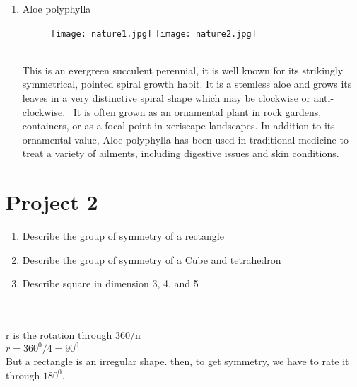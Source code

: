 \documentclass{article}
\begin{document}
\begin{enumerate}
    \item Aloe polyphylla
\graphicspath{{pictures/}}
\begin{figure}[htp]
    \texttt{[image: nature1.jpg]}
    \texttt{[image: nature2.jpg]}
\end{figure}
\\
This is an  evergreen succulent perennial, it is well known for its strikingly symmetrical, pointed spiral growth habit. It is a stemless aloe and grows its leaves in a very distinctive spiral shape which may be clockwise or anti-clockwise. 
It is often grown as an ornamental plant in rock gardens, containers, or as a focal point in xeriscape landscapes. In addition to its ornamental value, Aloe polyphylla has been used in traditional medicine to treat a variety of ailments, including digestive issues and skin conditions.
\end{enumerate}
\section{Project 2}
\begin{enumerate}
    \item Describe the group of symmetry of a rectangle
    \item Describe the group of symmetry of a Cube and tetrahedron
   \item Describe square in dimension 3, 4, and 5
\end{enumerate}

\newcommand{\Rectang}[4]{
\begin{tikzpicture}
\drawGraphNo{3}
\draw (-2,1)[] -| node[pos=0,left]{$#1$} 
              node[pos=.5,right]{$#2$} 
              (2,-1) -|  node[pos=0,right]{$#3$}
  node[pos=.5,left]{$#4$} cycle;

\end{tikzpicture}
}
\\
\\
r is the rotation through 360/n\\
$r=360^0/4=90^0$\\
But a rectangle is an irregular shape. then, to get symmetry, we have to rate it through $180^0$.
\end{document}
